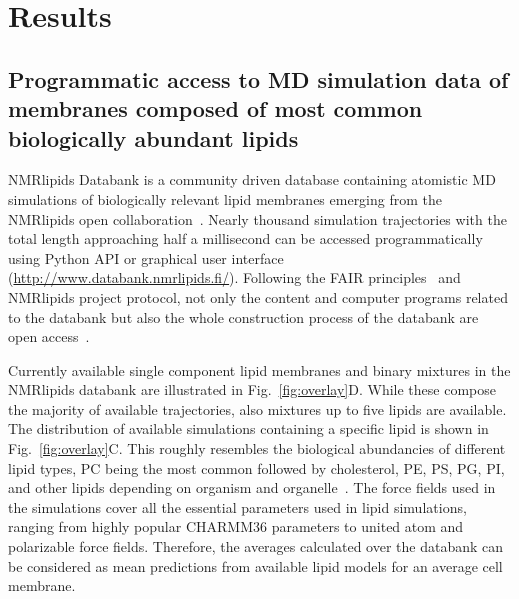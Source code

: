 \documentclass[fleqn,10pt]{wlscirep}
\begin{document}
\section{Results}

\subsection{Programmatic access to MD simulation data of membranes composed of most common biologically abundant lipids}

NMRlipids Databank is a community driven database containing atomistic MD simulations of biologically relevant lipid membranes emerging from the NMRlipids open collaboration~\cite{botan15,ollila16,catte16,antila19,bacle21}. Nearly thousand simulation trajectories with the total length approaching half a millisecond can be accessed programmatically using Python API or graphical user interface (\url{http://www.databank.nmrlipids.fi/}). 
Following the FAIR principles~\cite{wilkinson16} and NMRlipids project protocol, not only the content and computer programs related to the databank but also the whole construction process of the databank are open access~\cite{botan15}. 

Currently available single component lipid membranes and binary mixtures in the NMRlipids databank are illustrated in Fig.~\ref{fig:overlay}D. While these compose the majority of available trajectories, also mixtures up to five lipids are available. The distribution of available simulations containing a specific lipid is shown in Fig.~\ref{fig:overlay}C. This roughly resembles the biological abundancies of different lipid types, PC being the most common followed by cholesterol, PE, PS, PG, PI, and other lipids depending on organism and organelle~\cite{vanmeer08}. The force fields used in the simulations cover all the essential parameters used in lipid simulations, ranging from highly popular CHARMM36 parameters to united atom and polarizable force fields. Therefore, the averages calculated over the databank can be considered as mean predictions from available lipid models for an average cell membrane.
\end{document}
